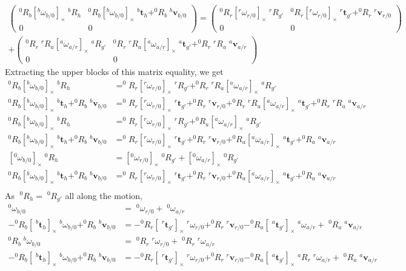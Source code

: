 \documentclass{article}
\newcommand\linvel{\mathbf{v}}
\newcommand\trans{\mathbf{t}}
\begin{document}
\begin{align*}
  \left(\begin{array}{ll}^0R_b[^b\omega_{b/0}]_{\times}\;^bR_h & ^0R_b[^b\omega_{b/0}]_{\times}\;^b\trans_h + ^0R_b\;^b\linvel_{b/0} \\ 0&0\end{array}\right) =
    \left(\begin{array}{ll}^0R_r[^r\omega_{r/0}]_{\times}\;^rR_{g'} & ^0R_r[^r\omega_{r/0}]_{\times}\;^r\trans_{g'} + ^0R_r\;^r\linvel_{r/0} \\ 0&0\end{array}\right) \\
      + \left(\begin{array}{ll}^0R_r\;^rR_a[^a\omega_{a/r}]_{\times}\;^aR_{g'} &
        ^0R_r\;^rR_a[^a\omega_{a/r}]_{\times}\;^a\trans_{g'}  + ^0R_r\;^rR_a\;^a\linvel_{a/r}\\ 0&0\end{array}\right)&
\end{align*}
Extracting the upper blocks of this matrix equality, we get
\begin{align*}
  ^0R_b[^b\omega_{b/0}]_{\times}\;^bR_h &= ^0R_r[^r\omega_{r/0}]_{\times}\;^rR_{g'} + ^0R_r\;^rR_a[^a\omega_{a/r}]_{\times}\;^aR_{g'} \\
  ^0R_b[^b\omega_{b/0}]_{\times}\;^b\trans_h + ^0R_b\;^b\linvel_{b/0} &=
  ^0R_r[^r\omega_{r/0}]_{\times}\;^r\trans_{g'} + ^0R_r\;^r\linvel_{r/0} + ^0R_r\;^rR_a[^a\omega_{a/r}]_{\times}\;^a\trans_{g'}  + ^0R_r\;^rR_a\;^a\linvel_{a/r} \\
  ^0R_b[^b\omega_{b/0}]_{\times}\;^bR_h &= ^0R_r[^r\omega_{r/0}]_{\times}\;^rR_{g'} + ^0R_a[^a\omega_{a/r}]_{\times}\;^aR_{g'} \\
  ^0R_b[^b\omega_{b/0}]_{\times}\;^b\trans_h + ^0R_b\;^b\linvel_{b/0} &=
  ^0R_r[^r\omega_{r/0}]_{\times}\;^r\trans_{g'} + ^0R_r\;^r\linvel_{r/0} + ^0R_a[^a\omega_{a/r}]_{\times}\;^a\trans_{g'}  + ^0R_a\;^a\linvel_{a/r} \\
  [^0\omega_{b/0}]_{\times}\;^0R_h &= [^0\omega_{r/0}]_{\times}\;^0R_{g'} + [^0\omega_{a/r}]_{\times}\;^0R_{g'} \\
  ^0R_b[^b\omega_{b/0}]_{\times}\;^b\trans_h + ^0R_b\;^b\linvel_{b/0} &=
  ^0R_r[^r\omega_{r/0}]_{\times}\;^r\trans_{g'} + ^0R_r\;^r\linvel_{r/0} + ^0R_a[^a\omega_{a/r}]_{\times}\;^a\trans_{g'}  + ^0R_a\;^a\linvel_{a/r} \\
\end{align*}
As $\;^0R_h = \;^0R_{g'}$ all along the motion,
\begin{align*}
  ^0\omega_{b/0} &= \;^0\omega_{r/0} + \;^0\omega_{a/r}\\
  -^0R_b[\;^b\trans_h]_{\times}\;^b\omega_{b/0} + ^0R_b\;^b\linvel_{b/0} &=
  -^0R_r[\;^r\trans_{g'}]_{\times}\;^r\omega_{r/0} + ^0R_r\;^r\linvel_{r/0} - ^0R_a[\;^a\trans_{g'}]_{\times}\;^a\omega_{a/r} + \;^0R_a\;^a\linvel_{a/r} \\
  ^0R_b\;^b\omega_{b/0} &= \;^0R_r\;^r\omega_{r/0} + \;^0R_r\;^r\omega_{a/r}\\
  -^0R_b[\;^b\trans_h]_{\times}\;^b\omega_{b/0} + ^0R_b\;^b\linvel_{b/0} &=
  -^0R_r[\;^r\trans_{g'}]_{\times}\;^r\omega_{r/0} + ^0R_r\;^r\linvel_{r/0} - ^0R_a[\;^a\trans_{g'}]_{\times} \;^aR_{r}\;^r\omega_{a/r} + \;^0R_a\;^a\linvel_{a/r}
\end{align*}
\end{document}
